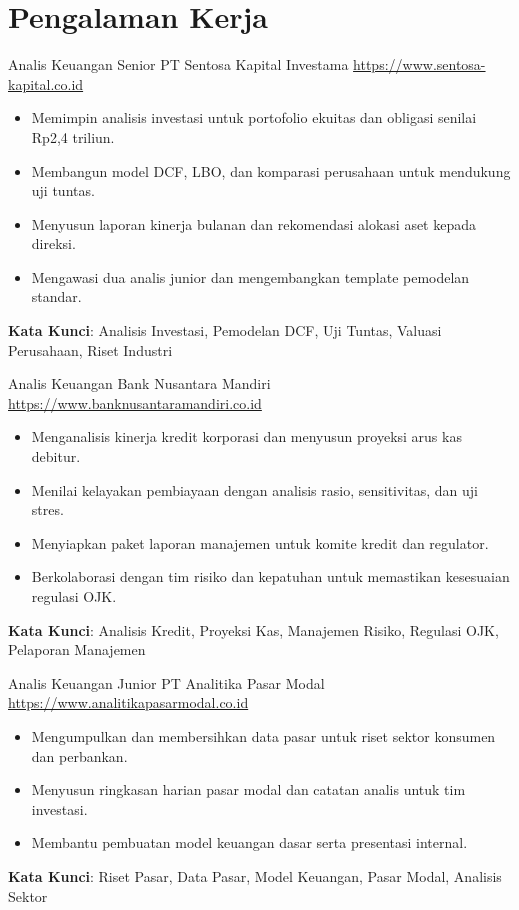 \documentclass[a4paper, serif, 10pt]{moderncv}
\begin{document}
\section{Pengalaman Kerja}

        {Analis Keuangan Senior}
        {PT Sentosa Kapital Investama}
        {\url{https://www.sentosa-kapital.co.id}}
        {}
        {\begin{itemize}
\item Memimpin analisis investasi untuk portofolio ekuitas dan obligasi senilai Rp2,4 triliun.
\item Membangun model DCF, LBO, dan komparasi perusahaan untuk mendukung uji tuntas.
\item Menyusun laporan kinerja bulanan dan rekomendasi alokasi aset kepada direksi.
\item Mengawasi dua analis junior dan mengembangkan template pemodelan standar.
\end{itemize}
\textbf{Kata Kunci}: Analisis Investasi, Pemodelan DCF, Uji Tuntas, Valuasi Perusahaan, Riset Industri}

        {Analis Keuangan}
        {Bank Nusantara Mandiri}
        {\url{https://www.banknusantaramandiri.co.id}}
        {}
        {\begin{itemize}
\item Menganalisis kinerja kredit korporasi dan menyusun proyeksi arus kas debitur.
\item Menilai kelayakan pembiayaan dengan analisis rasio, sensitivitas, dan uji stres.
\item Menyiapkan paket laporan manajemen untuk komite kredit dan regulator.
\item Berkolaborasi dengan tim risiko dan kepatuhan untuk memastikan kesesuaian regulasi OJK.
\end{itemize}
\textbf{Kata Kunci}: Analisis Kredit, Proyeksi Kas, Manajemen Risiko, Regulasi OJK, Pelaporan Manajemen}

        {Analis Keuangan Junior}
        {PT Analitika Pasar Modal}
        {\url{https://www.analitikapasarmodal.co.id}}
        {}
        {\begin{itemize}
\item Mengumpulkan dan membersihkan data pasar untuk riset sektor konsumen dan perbankan.
\item Menyusun ringkasan harian pasar modal dan catatan analis untuk tim investasi.
\item Membantu pembuatan model keuangan dasar serta presentasi internal.
\end{itemize}
\textbf{Kata Kunci}: Riset Pasar, Data Pasar, Model Keuangan, Pasar Modal, Analisis Sektor}
\end{document}
